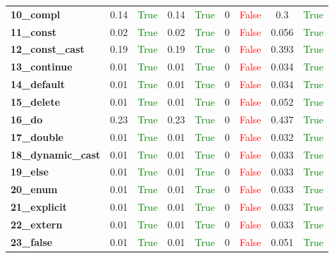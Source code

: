\documentclass{article}
\begin{document}
\begin{xltabular}{\textwidth}{lcccccccc}
\textbf{10\_compl}& 0.14&\textcolor{green}{True}& 0.14&\textcolor{green}{True}& 0&\textcolor{red}{False}& 0.3&\textcolor{green}{True} \\[0.5ex]
\textbf{11\_const}& 0.02&\textcolor{green}{True}& 0.02&\textcolor{green}{True}& 0&\textcolor{red}{False}& 0.056&\textcolor{green}{True} \\[0.5ex]
\textbf{12\_const\_cast}& 0.19&\textcolor{green}{True}& 0.19&\textcolor{green}{True}& 0&\textcolor{red}{False}& 0.393&\textcolor{green}{True} \\[0.5ex]
\textbf{13\_continue}& 0.01&\textcolor{green}{True}& 0.01&\textcolor{green}{True}& 0&\textcolor{red}{False}& 0.034&\textcolor{green}{True} \\[0.5ex]
\textbf{14\_default}& 0.01&\textcolor{green}{True}& 0.01&\textcolor{green}{True}& 0&\textcolor{red}{False}& 0.034&\textcolor{green}{True} \\[0.5ex]
\textbf{15\_delete}& 0.01&\textcolor{green}{True}& 0.01&\textcolor{green}{True}& 0&\textcolor{red}{False}& 0.052&\textcolor{green}{True} \\[0.5ex]
\textbf{16\_do}& 0.23&\textcolor{green}{True}& 0.23&\textcolor{green}{True}& 0&\textcolor{red}{False}& 0.437&\textcolor{green}{True} \\[0.5ex]
\textbf{17\_double}& 0.01&\textcolor{green}{True}& 0.01&\textcolor{green}{True}& 0&\textcolor{red}{False}& 0.032&\textcolor{green}{True} \\[0.5ex]
\textbf{18\_dynamic\_cast}& 0.01&\textcolor{green}{True}& 0.01&\textcolor{green}{True}& 0&\textcolor{red}{False}& 0.033&\textcolor{green}{True} \\[0.5ex]
\textbf{19\_else}& 0.01&\textcolor{green}{True}& 0.01&\textcolor{green}{True}& 0&\textcolor{red}{False}& 0.033&\textcolor{green}{True} \\[0.5ex]
\textbf{20\_enum}& 0.01&\textcolor{green}{True}& 0.01&\textcolor{green}{True}& 0&\textcolor{red}{False}& 0.033&\textcolor{green}{True} \\[0.5ex]
\textbf{21\_explicit}& 0.01&\textcolor{green}{True}& 0.01&\textcolor{green}{True}& 0&\textcolor{red}{False}& 0.033&\textcolor{green}{True} \\[0.5ex]
\textbf{22\_extern}& 0.01&\textcolor{green}{True}& 0.01&\textcolor{green}{True}& 0&\textcolor{red}{False}& 0.033&\textcolor{green}{True} \\[0.5ex]
\textbf{23\_false}& 0.01&\textcolor{green}{True}& 0.01&\textcolor{green}{True}& 0&\textcolor{red}{False}& 0.051&\textcolor{green}{True} \\[0.5ex]

\end{xltabular}
\end{document}
